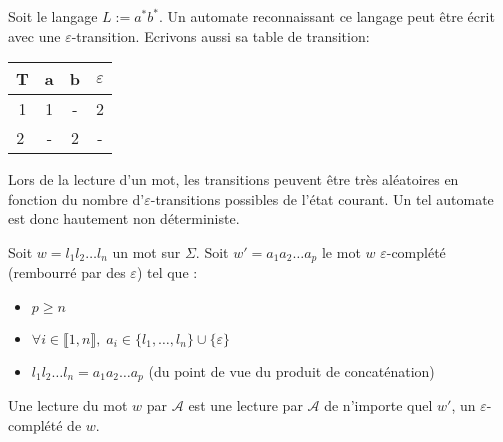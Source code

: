 \begin{example}
    Soit le langage $L := a^*b^*$. Un automate reconnaissant ce langage peut être écrit avec une 
    $\varepsilon$-transition. Ecrivons aussi sa table de transition: 
    \begin{center}
        \begin{minipage}{0.45\textwidth} %
        \end{minipage}%
        \hfill 
        \begin{minipage}{0.45\textwidth} %
            \begin{tabular}{c|c|c|c}
                T & a & b & $\varepsilon$ \\ \hline 
                1 & 1 & - & 2 \\ \hline 
                \textcircled{2} & - & 2 & - \\ \hline 
            \end{tabular}
        \end{minipage}
    \end{center}
\end{example}

Lors de la lecture d'un mot, les transitions peuvent être très aléatoires en fonction du nombre 
d'$\varepsilon$-transitions possibles de l'état courant. Un tel automate est donc hautement non déterministe. 


\begin{definition}
    Soit $w = l_1 l_2 \dots l_n $ un mot sur $\Sigma$. 
    Soit $w' = a_1 a_2 \dots a_p$ le mot $w$ $\varepsilon$-complété (rembourré par des $\varepsilon$) tel que :
    \begin{itemize}
        \item $p \geqslant n$ 
        \item $ \forall i \in \llbracket 1, n \rrbracket, \; a_i \in \{l_1, \dots, l_n\} \cup \{\varepsilon\}$ 
        \item $l_1 l_2 \dots l_n = a_1 a_2 \dots a_p$ (du point de vue du produit de concaténation)
    \end{itemize}
    Une lecture du mot $w$ par $ \mathcal{A}$ est une lecture par $ \mathcal{A}$ de n'importe quel $w'$, 
    un $\varepsilon$-complété de $w$. 
\end{definition}

